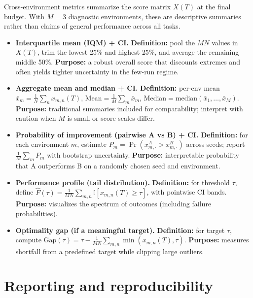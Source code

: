 Cross-environment metrics summarize the score matrix $X(T)$ at the final budget. With
$M=3$ diagnostic environments, these are descriptive summaries rather than claims of
general performance across all tasks. \cite{agarwal2021precipice,patterson2024edrl}

\begin{itemize}

\item \textbf{Interquartile mean (IQM) + CI.}  
  \textbf{Definition:} pool the $MN$ values in $X(T)$, trim the lowest 25\% and highest 25\%,
  and average the remaining middle 50\%.  
  \textbf{Purpose:} a robust overall score that discounts extremes and often yields tighter
  uncertainty in the few-run regime. \cite{agarwal2021precipice}

\item \textbf{Aggregate mean and median + CI.}  
  \textbf{Definition:} per-env mean $\bar{x}_m=\frac{1}{N}\sum_{n}x_{m,n}(T)$,
  Mean$=\frac{1}{M}\sum_m\bar{x}_m$, Median$=\mathrm{median}(\bar{x}_1,\dots,\bar{x}_M)$.  
  \textbf{Purpose:} traditional summaries included for comparability; interpret with caution
  when $M$ is small or score scales differ.

\item \textbf{Probability of improvement (pairwise A vs B) + CI.}  
  \textbf{Definition:} for each environment $m$, estimate
  $P_m=\Pr(x^A_{m,\cdot}>x^B_{m,\cdot})$ across seeds; report $\frac{1}{M}\sum_mP_m$ with bootstrap
  uncertainty.  
  \textbf{Purpose:} interpretable probability that A outperforms B on a randomly chosen seed
  and environment. \cite{agarwal2021precipice}

\item \textbf{Performance profile (tail distribution).}  
  \textbf{Definition:} for threshold $\tau$, define
  $\hat{F}(\tau)=\frac{1}{MN}\sum_{m,n}\mathbb{I}[x_{m,n}(T)\ge\tau]$, with pointwise CI bands.  
  \textbf{Purpose:} visualizes the spectrum of outcomes (including failure probabilities).
  \cite{agarwal2021precipice}

\item \textbf{Optimality gap (if a meaningful target).}  
  \textbf{Definition:} for target $\tau$, compute
  $\mathrm{Gap}(\tau)=\tau-\frac{1}{MN}\sum_{m,n}\min(x_{m,n}(T),\tau)$.  
  \textbf{Purpose:} measures shortfall from a predefined target while clipping large outliers.

\end{itemize}

\section{Reporting and reproducibility}

